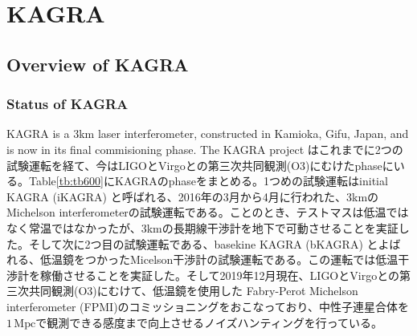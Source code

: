 \chapter{KAGRA}
\section{Overview of KAGRA}
\subsection{Status of KAGRA}
KAGRA is a 3km laser interferometer, constructed in Kamioka, Gifu, Japan, and is now in its final commisioning phase. The KAGRA project はこれまでに2つの試験運転を経て、今はLIGOとVirgoとの第三次共同観測(O3)にむけたphaseにいる。Table\ref{tb:tb600}にKAGRAのphaseをまとめる。1つめの試験運転はinitial KAGRA (iKAGRA) と呼ばれる、2016年の3月から4月に行われた、3kmのMichelson interferometerの試験運転である。ことのとき、テストマスは低温ではなく常温ではなかったが、3kmの長期線干渉計を地下で可動させることを実証した。そして次に2つ目の試験運転である、basekine KAGRA (bKAGRA) とよばれる、低温鏡をつかったMicelson干渉計の試験運転である。この運転では低温干渉計を稼働させることを実証した。そして2019年12月現在、LIGOとVirgoとの第三次共同観測(O3)にむけて、低温鏡を使用した Fabry-Perot Michelson interferometer (FPMI)のコミッショニングをおこなっており、中性子連星合体を$1\,\mathrm{Mpc}$で観測できる感度まで向上させるノイズハンティングを行っている。


